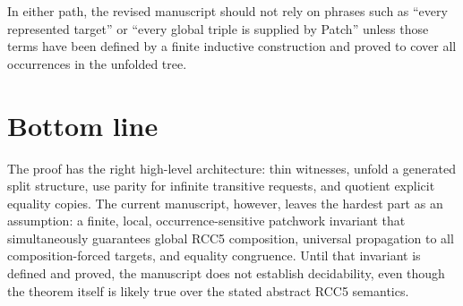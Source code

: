 \documentclass[11pt]{article}
\begin{document}
In either path, the revised manuscript should not rely on phrases such as ``every represented target'' or ``every global triple is supplied by Patch'' unless those terms have been defined by a finite inductive construction and proved to cover all occurrences in the unfolded tree.

\section{Bottom line}

The proof has the right high-level architecture: thin witnesses, unfold a generated split structure, use parity for infinite transitive requests, and quotient explicit equality copies.  The current manuscript, however, leaves the hardest part as an assumption: a finite, local, occurrence-sensitive patchwork invariant that simultaneously guarantees global RCC5 composition, universal propagation to all composition-forced targets, and equality congruence.  Until that invariant is defined and proved, the manuscript does not establish decidability, even though the theorem itself is likely true over the stated abstract RCC5 semantics.
\end{document}
